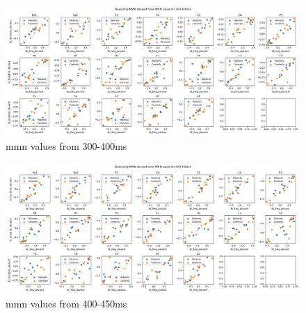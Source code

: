 \documentclass[10pt]{article}
\begin{document}
\begin{figure}[H]
  \includegraphics[width=16cm]{../../../data_analysis_results/MMN/features/deviant_tone_3.png}
  \caption{\gls{mmn} values from 300-400ms}\label{mmnvalue_300_400ms}
\end{figure}
\begin{figure}[H]
  \includegraphics[width=16cm]{../../../data_analysis_results/MMN/features/deviant_tone_4.png}
  \caption{\gls{mmn} values from 400-450ms}\label{mmnvalue_400_450ms}
\end{figure}
\end{document}
